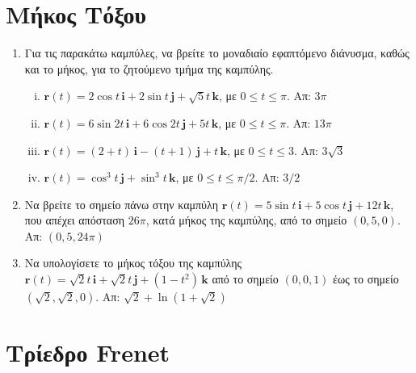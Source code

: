 \documentclass[a4paper,table]{report}
\begin{document}
\begin{center}
  \minibox{\bfseries\large \textcolor{Col1}{Ασκήσεις στις Καμπύλες}} 
\end{center} 



\section*{Μήκος Τόξου}

\begin{enumerate}
  \item Για τις παρακάτω καμπύλες, να βρείτε το μοναδιαίο εφαπτόμενο διάνυσμα, 
    καθώς και το μήκος, για το ζητούμενο τμήμα της καμπύλης.
    \begin{enumerate}[i)]
      \item $ \mathbf{r}(t)=2 \cos{t}\, \mathbf{i} + 2 \sin{t}\, \mathbf{j} +
        \sqrt{5} t \, \mathbf{k}$, \; με $ 0 \leq t \leq \pi $. \hfill Απ: $ 3 \pi $  
      \item $ \mathbf{r}(t)=6 \sin{2t}\, \mathbf{i} + 6 \cos{2t}\, \mathbf{j} + 5t \, 
        \mathbf{k} $, \; με $ 0 \leq t \leq \pi $. \hfill Απ: $ 13 \pi $  
      \item $ \mathbf{r}(t)=(2+t)\, \mathbf{i} - (t+1) \, \mathbf{j} + t \, \mathbf{k} $,
       \; με $ 0 \leq t \leq 3 $. \hfill Απ: $ 3 \sqrt{3} $ 
      \item $ \mathbf{r}(t)= \cos^{3}{t}\, \mathbf{j} + \sin^{3}{t}\, \mathbf{k} $, 
        \; με $ 0 \leq t \leq \pi /2 $. \hfill Απ: $ 3/2 $ 
    \end{enumerate}

  \item Να βρείτε το σημείο πάνω στην καμπύλη $ \mathbf{r}(t)=5 \sin{t}\, \mathbf{i} + 5
    \cos{t}\, \mathbf{j} + 12t \, \mathbf{k} $, που απέχει απόσταση $ 26 \pi $, κατά 
    μήκος της καμπύλης, από το σημείο $ (0,5,0) $. \hfill Απ: $ (0,5,24 \pi) $  

  \item Να υπολογίσετε το μήκος τόξου της καμπύλης $ \mathbf{r}(t)= \sqrt{2} t\, 
    \mathbf{i} + \sqrt{2} t \, \mathbf{j} + (1-t^{2}) \, \mathbf{k} $ από το σημείο 
    $ (0,0,1) $ έως το σημείο $ (\sqrt{2} , \sqrt{2} , 0) $. 
    \hfill Απ:  $ \sqrt{2} + \ln{(1+ \sqrt{2})} $
\end{enumerate}

\section*{Τρίεδρο Frenet}
\end{document}
